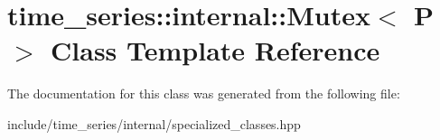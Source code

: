 \hypertarget{classtime__series_1_1internal_1_1Mutex}{}\section{time\+\_\+series\+:\+:internal\+:\+:Mutex$<$ P $>$ Class Template Reference}
\label{classtime__series_1_1internal_1_1Mutex}


The documentation for this class was generated from the following file\+:\begin{DoxyCompactItemize}
\item 
include/time\+\_\+series/internal/specialized\+\_\+classes.\+hpp\end{DoxyCompactItemize}
